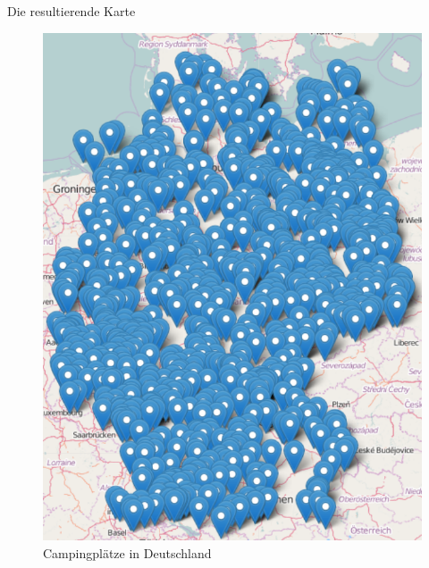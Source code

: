 \documentclass[ignorenonframetext,]{beamer}
\begin{document}
\begin{frame}{Die resultierende Karte}

\begin{figure}
\centering
\includegraphics{figure/Germany_Campsites.PNG}
\caption{Campingplätze in Deutschland}
\end{figure}

\end{frame}
\end{document}
